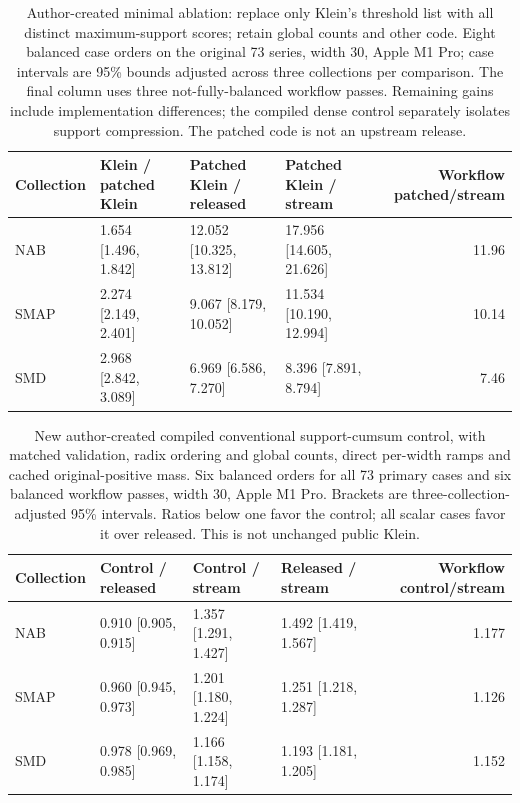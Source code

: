 \begin{table}[t]\centering\small
\begin{tabular}{llllr}\toprule
Collection & Klein / patched Klein & Patched Klein / released & Patched Klein / stream & Workflow patched/stream\\\midrule
NAB & 1.654 [1.496, 1.842] & 12.052 [10.325, 13.812] & 17.956 [14.605, 21.626] & 11.96\\
SMAP & 2.274 [2.149, 2.401] & 9.067 [8.179, 10.052] & 11.534 [10.190, 12.994] & 10.14\\
SMD & 2.968 [2.842, 3.089] & 6.969 [6.586, 7.270] & 8.396 [7.891, 8.794] & 7.46\\
\bottomrule\end{tabular}
\caption{Author-created minimal ablation: replace only Klein's threshold list
with all distinct maximum-support scores; retain global counts and other code.
Eight balanced case orders on the original 73 series, width 30, Apple M1 Pro;
case intervals are 95\% bounds adjusted across three collections per comparison.
The final column uses three not-fully-balanced workflow passes. Remaining
gains include implementation differences; the compiled dense control separately
isolates support compression. The patched code is not an upstream release.}
\label{tab:klein-control}\end{table}
\begin{table}[t]\centering\small
\begin{tabular}{llllr}\toprule
Collection & Control / released & Control / stream & Released / stream & Workflow control/stream\\\midrule
NAB & 0.910 [0.905, 0.915] & 1.357 [1.291, 1.427] & 1.492 [1.419, 1.567] & 1.177\\
SMAP & 0.960 [0.945, 0.973] & 1.201 [1.180, 1.224] & 1.251 [1.218, 1.287] & 1.126\\
SMD & 0.978 [0.969, 0.985] & 1.166 [1.158, 1.174] & 1.193 [1.181, 1.205] & 1.152\\
\bottomrule\end{tabular}
\caption{New author-created compiled conventional support-cumsum control, with
matched validation, radix ordering and global counts, direct per-width ramps
and cached original-positive mass. Six balanced orders for all 73 primary
cases and six balanced workflow passes, width 30, Apple M1 Pro. Brackets are
three-collection-adjusted 95\% intervals. Ratios below one favor the control;
all scalar cases favor it over released. This is not unchanged public Klein.}
\label{tab:compiled-control}\end{table}
